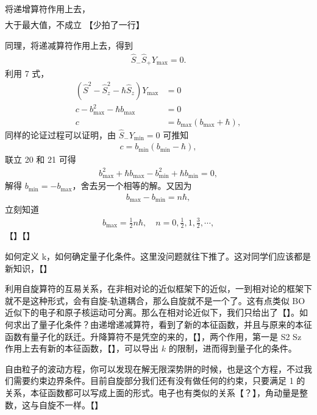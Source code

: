 将递增算符作用上去，
\begin{align}
    [][]
\end{align}
大于最大值，不成立
【少拍了一行】

同理，将递减算符作用上去，得到
\begin{align}
    \hat S_- \hat S_+ Y_{\text{max}} = 0. 
\end{align}
利用 {7} 式，
\begin{align}
    (\hat S^2 - \hat S_z^2 - \hbar \hat S_z) Y_{\text{max}} &= 0 \\
    c - b_{\text{max}} ^2 - \hbar b_{\text{max}} &= 0\\
    c &= b_{\text{max}} ( b_{\text{max}} + \hbar),
\end{align}
同样的论证过程可以证明，由 $\hat S_- Y_{\text{min}} = 0$ 可推知
\begin{align}
    c = b_{\text{min}} ( b_{\text{min}} - \hbar), 
\end{align}
联立 {20} 和 {21} 可得
\begin{align}
    b_{\text{max}}^2 + \hbar b_{\text{max}} - b_{\text{min}}^2 + \hbar b_{\text{min}} = 0,
\end{align}
解得 $b_{\text{min}} = - b_{\text{max}}$，舍去另一个相等的解。又因为
\begin{align}
    b_{\text{max}} - b_{\text{min}} = n\hbar, 
\end{align}
立刻知道
\begin{align}
    b_{\text{max}} = \frac12 n\hbar, \quad n = 0, \frac12, 1, \frac32, \cdots,
\end{align}
【】【】

如何定义 k，如何确定量子化条件。这里没问题就往下推了。这对同学们应该都是新知识，【】

利用自旋算符的互易关系，在非相对论的近似框架下的近似，一到相对论的框架下就不是这种形式，会有自旋-轨道耦合，那么自旋就不是一个了。这有点类似 BO 近似下的电子和原子核运动可分离。那么在相对论近似下，我们只给出了【】。如何求出了量子化条件？由递增递减算符，看到了新的本征函数，并且与原来的本征函数有量子化的跃迁。升降算符不是凭空的来的，【】，两个作用，第一是 S2 Sz 作用上去有新的本征函数，【】，可以导出 $k$ 的限制，进而得到量子化的条件。

自由粒子的波动方程，你可以发现在解无限深势阱的时候，也是这个方程，不过我们需要约束边界条件。目前自旋部分我们还有没有做任何的约束，只要满足 {1} 的关系，本征函数都可以写成上面的形式。电子也有类似的关系【？】，角动量是整数，这与自旋不一样。【】

